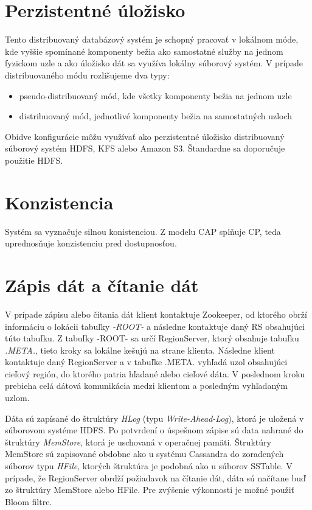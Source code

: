 \documentclass[11pt,twoside,a4paper]{book}
\begin{document}



\section{Perzistentné úložisko}

Tento distribuovaný databázový systém je schopný pracovať v lokálnom móde, kde vyššie spomínané komponenty bežia ako samostatné služby na jednom fyzickom uzle a ako úložisko dát sa využíva lokálny súborový systém. V prípade distribuovaného módu rozlišujeme dva typy:
\begin{itemize}
 \item pseudo-distribuovaný mód, kde všetky komponenty bežia na jednom uzle
 \item distribuovaný mód, jednotlivé komponenty bežia na samostatných uzloch
\end{itemize}

Obidve konfigurácie môžu využívať ako perzistentné úložisko distribuovaný súborový systém HDFS, KFS alebo Amazon S3. Štandardne sa doporučuje použitie HDFS.

\section{Konzistencia}

Systém sa vyznačuje silnou konistenciou. Z modelu CAP splňuje CP, teda uprednosňuje konzistenciu pred dostupnosťou.


\section{Zápis dát a čítanie dát}


V prípade zápisu alebo čítania dát klient kontaktuje Zookeeper, od ktorého obrží informáciu o lokácii tabuľky \emph{-ROOT-} a následne kontaktuje daný RS obsahujúci túto tabuľku. Z tabuľky -ROOT- sa určí RegionServer, ktorý obsahuje tabuľku \emph{.META.}, tieto kroky sa lokálne kešujú na strane klienta. Následne klient kontaktuje daný RegionServer a v tabuľke .META. vyhľadá uzol obsahujúci cieľový región, do ktorého patria hľadané alebo cieľové dáta. V poslednom kroku prebieha celá dátová komunikácia medzi klientom a posledným vyhľadaným uzlom.

Dáta sú zapísané do štruktúry \emph{HLog} (typu \emph{Write-Ahead-Log}), ktorá je uložená v súborovom systéme HDFS. Po potvrdení o úspešnom zápise sú data nahrané do štruktúry \emph{MemStore}, ktorá je uschovaná v operačnej pamäti. Štruktúry MemStore sú zapisované obdobne ako u systému Cassandra do zoradených súborov typu \emph{HFile}, ktorých štruktúra je podobná ako u súborov SSTable. 
\noindent
V  prípade, že RegionServer obrdží požiadavok na čítanie dát, dáta sú načítane buď zo štruktúry MemStore alebo HFile. Pre zvýšenie výkonnosti je možné použiť Bloom filtre.
\end{document}
